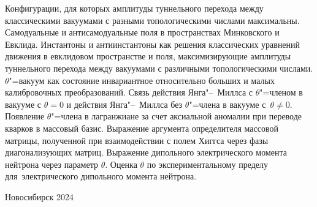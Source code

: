 \documentclass[12pt,pagesize,paper=landscape,paper=192mm:108mm]{scrbook}
\begin{document}
\begin{titlepage}
  \vspace*{-0.5em}
  \begin{center}    


    



    \normalsize
    \begin{minipage}{0.75\linewidth}
      Конфигурации, для которых амплитуды туннельного перехода между
      классическими вакуумами с разными топологическими числами
      максимальны. Самодуальные и антисамодуальные поля в
      пространствах Минковского и Евклида. Инстантоны и антиинстантоны
      как решения классических уравнений движения в евклидовом
      пространстве и поля, максимизирующие амплитуды туннельного
      перехода между вакуумами с различными топологическими числами.
      $\theta$"=вакуум как состояние инвариантное относительно больших
      и малых калибровочных преобразований. Связь действия
      Янга"--~Миллса с $\theta$"=членом в вакууме с $\theta=0$ и
      действия Янга"--~Миллса без $\theta$"=члена в вакууме с~$\theta\ne0$. Появление $\theta$"=члена в лагранжиане за счет
      аксиальной аномалии при переводе кварков в массовый
      базис. Выражение аргумента определителя массовой матрицы,
      полученной при взаимодействии с полем Хиггса через фазы
      диагонализующих матриц. Выражение дипольного электрического
      момента нейтрона через параметр $\theta$. Оценка $\theta$ по
      экспериментальному пределу для~электрического дипольного момента
      нейтрона.
    \end{minipage}
    \vfill

    \normalsize \ccbysa\hspace{0.5em}  Новосибирск 2024
  \end{center}
\end{titlepage}
\end{document}
